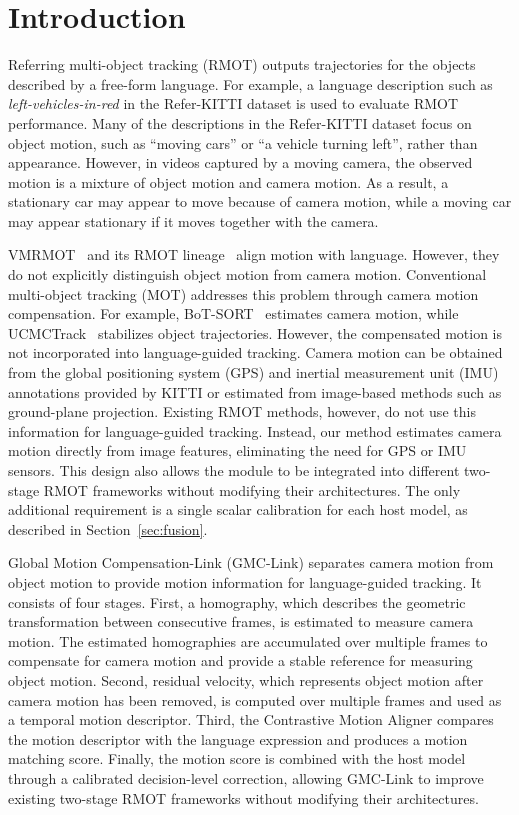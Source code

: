 \documentclass[sigconf,anonymous,nonacm]{acmart}
\begin{document}
\section{Introduction}
\label{sec:intro}

Referring multi-object tracking (RMOT) outputs trajectories for the objects described by a free-form language. For example, a language description such as \emph{left-vehicles-in-red} in the Refer-KITTI dataset is used to evaluate RMOT performance. Many of the descriptions in the Refer-KITTI dataset focus on object motion, such as ``moving cars'' or ``a vehicle turning left'', rather than appearance. However, in videos captured by a moving camera, the observed motion is a mixture of object motion and camera motion. As a result, a stationary car may appear to move because of camera motion, while a moving car may appear stationary if it moves together with the camera.

VMRMOT~\cite{vmrmot} and its RMOT lineage~\cite{transrmot,ikun,flexhook} align motion with language. However, they do not explicitly distinguish object motion from camera motion. Conventional multi-object tracking (MOT) addresses this problem through camera motion compensation. For example, BoT-SORT~\cite{botsort} estimates camera motion, while UCMCTrack~\cite{ucmctrack} stabilizes object trajectories. However, the compensated motion is not incorporated into language-guided tracking. Camera motion can be obtained from the global positioning system (GPS) and inertial measurement unit (IMU) annotations provided by KITTI or estimated from image-based methods such as ground-plane projection. Existing RMOT methods, however, do not use this information for language-guided tracking. Instead, our method estimates camera motion directly from image features, eliminating the need for GPS or IMU sensors. This design also allows the module to be integrated into different two-stage RMOT frameworks without modifying their architectures. The only additional requirement is a single scalar calibration for each host model, as described in Section~\ref{sec:fusion}.

Global Motion Compensation-Link (GMC-Link) separates camera motion from object motion to provide motion information for language-guided tracking. It consists of four stages. First, a homography, which describes the geometric transformation between consecutive frames, is estimated to measure camera motion. The estimated homographies are accumulated over multiple frames to compensate for camera motion and provide a stable reference for measuring object motion. Second, residual velocity, which represents object motion after camera motion has been removed, is computed over multiple frames and used as a temporal motion descriptor. Third, the Contrastive Motion Aligner compares the motion descriptor with the language expression and produces a motion matching score. Finally, the motion score is combined with the host model through a calibrated decision-level correction, allowing GMC-Link to improve existing two-stage RMOT frameworks without modifying their architectures.
\end{document}
